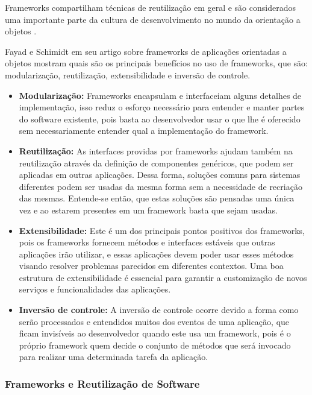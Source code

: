 Frameworks compartilham técnicas de reutilização em geral e são considerados uma importante parte da cultura de desenvolvimento no mundo da orientação a objetos \cite{Johnson:1997}.

Fayad e Schimidt em seu artigo \cite{Fayad:Schimidt:1997} sobre frameworks de aplicações orientadas a objetos mostram quais são os principais benefícios no uso de frameworks, que são: modularização, reutilização, extensibilidade e inversão de controle.

\begin{itemize}
	\item \textbf{Modularização:} Frameworks encapsulam e interfaceiam alguns detalhes de implementação, isso reduz o esforço necessário para entender e manter partes do software existente, pois basta ao desenvolvedor usar o que lhe é oferecido sem necessariamente entender qual a implementação do framework.

	\item \textbf{Reutilização:} As interfaces providas por frameworks ajudam também na reutilização através da definição de componentes genéricos, que podem ser aplicadas em outras aplicações. Dessa forma, soluções comuns para sistemas diferentes podem ser usadas da mesma forma sem a necessidade de recriação das mesmas. Entende-se então, que estas soluções são pensadas uma única vez e ao estarem presentes em um framework basta que sejam usadas.

	\item \textbf{Extensibilidade:} Este é um dos principais pontos positivos dos frameworks, pois os frameworks fornecem métodos e interfaces estáveis que outras aplicações irão utilizar, e essas aplicações devem poder usar esses métodos visando resolver problemas parecidos em diferentes contextos. Uma boa estrutura de extensibilidade é essencial para garantir a customização de novos serviços e funcionalidades das aplicações.

	\item \textbf{Inversão de controle:} A inversão de controle ocorre devido a forma como serão processados e entendidos muitos dos eventos de uma aplicação, que ficam invisíveis ao desenvolvedor quando este usa um framework, pois é o próprio framework quem decide o conjunto de métodos que será invocado para realizar uma determinada tarefa da aplicação.
\end{itemize}

\subsubsection{Frameworks e Reutilização de Software}


